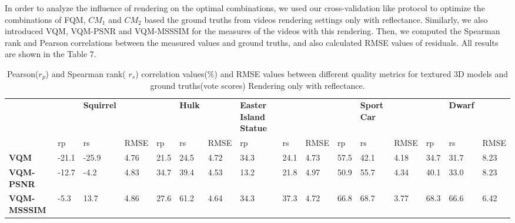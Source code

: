 In order to analyze the influence of rendering on the optimal combinations, we used our cross-validation like protocol to optimize the combinations of FQM, $CM_1$ and $CM_2$ based the ground truths from videos rendering settings only with reflectance. Similarly, we also introduced VQM, VQM-PSNR and VQM-MSSSIM for the measures of the videos with this rendering. Then, we computed the Spearman rank and Pearson correlations between the measured values and ground truths, and also calculated RMSE values of residuals. All results are shown in the Table 7.\\
\begin{table}[]
\centering
\caption{Pearson($r_p$) and Spearman rank( $r_s$) correlation values(\%) and RMSE values between different quality metrics for textured 3D models and ground truths(vote scores) Rendering only with reflectance.}
\label{my-label}
\begin{tabular}{llllllllllllllll}
                    & \textbf{}     & \textbf{Squirrel} & \textbf{}     & \textbf{}     & \textbf{Hulk} & \textbf{}     & \textbf{Easter Island Statue}     & \textbf{} & \textbf{}     & \textbf{}     & \textbf{Sport Car} & \textbf{}     & \textbf{}     & \textbf{Dwarf} &               \\
                    & rp            & rs                & RMSE          & rp            & rs            & RMSE          & rp            & rs                            & RMSE          & rp            & rs                 & RMSE          & rp            & rs             & RMSE          \\
\textbf{VQM}        & -21.1         & -25.9             & 4.76          & 21.5          & 24.5          & 4.72          & 34.3          & 24.1                          & 4.73          & 57.5          & 42.1               & 4.18          & 34.7          & 31.7           & 8.23          \\
\textbf{VQM-PSNR}   & -12.7         & -4.2              & 4.83          & 34.7          & 39.4          & 4.53          & 13.2          & 21.8                          & 4.97          & 50.9          & 55.7               & 4.34          & 40.1          & 33.0           & 8.23          \\
\textbf{VQM-MSSSIM} & -5.3          & 13.7              & 4.86          & 27.6          & 61.2          & 4.64          & 34.3          & 37.3                          & 4.72          & 66.8          & 68.7               & 3.77          & 68.3          & 66.6           & 6.42          \\

\end{tabular}
\end{table}
